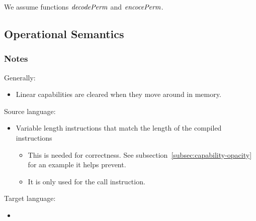 \documentclass[a4paper]{article}
\begin{document}
We assume functions $\decPerm{}$ and $\encPerm{}$.

\subsection{Operational Semantics}
\subsubsection{Notes}
Generally:
\begin{itemize}
\item Linear capabilities are cleared when they move around in memory.
\end{itemize}

Source language:
\begin{itemize}
\item Variable length instructions that match the length of the compiled instructions
  \begin{itemize}
  \item This is needed for correctness. See subsection~\ref{subsec:capability-opacity} for an example it helps prevent.
  \item It is only used for the call instruction.
  \end{itemize}
\end{itemize}


Target language:
\begin{itemize}
\item 
\end{itemize}
\end{document}
